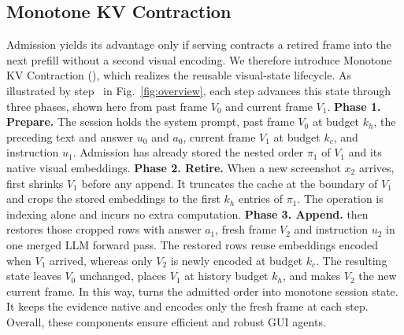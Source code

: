 \subsection{Monotone KV Contraction}
\label{sec:method-kv}
Admission yields its advantage only if serving contracts a retired frame into the next prefill without a second visual encoding.
%
We therefore introduce Monotone KV Contraction (\kvr{}), which realizes the reusable visual-state lifecycle.
%
As illustrated by step~ in Fig.~\ref{fig:overview}, each step advances this state through three phases, shown here from past frame $V_0$ and current frame $V_1$.
%
\noindent\textbf{Phase 1. Prepare.}
The session holds the system prompt, past frame $V_0$ at budget $k_h$, the preceding text and answer $u_0$ and $a_0$, current frame $V_1$ at budget $k_c$, and instruction $u_1$.
%
Admission has already stored the nested order $\pi_1$ of $V_1$ and its native visual embeddings.
%
\noindent\textbf{Phase 2. Retire.}
When a new screenshot $x_2$ arrives, \kvr{} first shrinks $V_1$ before any append.
%
It truncates the cache at the boundary of $V_1$ and crops the stored embeddings to the first $k_h$ entries of $\pi_1$.
%
The operation is indexing alone and incurs no extra computation.
%
\noindent\textbf{Phase 3. Append.}
\kvr{} then restores those cropped rows with answer $a_1$, fresh frame $V_2$ and instruction $u_2$ in one merged LLM forward pass.
%
The restored rows reuse embeddings encoded when $V_1$ arrived, whereas only $V_2$ is newly encoded at budget $k_c$.
%
The resulting state leaves $V_0$ unchanged, places $V_1$ at history budget $k_h$, and makes $V_2$ the new current frame.
%
In this way, \kvr{} turns the admitted order into monotone session state.
%
It keeps the evidence native and encodes only the fresh frame at each step.
%
Overall, these components ensure efficient and robust GUI agents.

